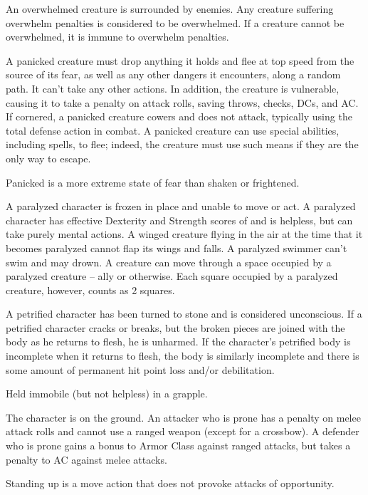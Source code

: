  An overwhelmed creature is surrounded by enemies. Any creature suffering overwhelm penalties is considered to be overwhelmed. If a creature cannot be overwhelmed, it is immune to overwhelm penalties.

 A panicked creature must drop anything it holds and flee at top speed from the source of its fear, as well as any other dangers it encounters, along a random path. It can't take any other actions. In addition, the creature is vulnerable, causing it to take a  penalty on attack rolls, saving throws, checks, DCs, and AC. If cornered, a panicked creature cowers and does not attack, typically using the total defense action in combat. A panicked creature can use special abilities, including spells, to flee; indeed, the creature must use such means if they are the only way to escape.

Panicked is a more extreme state of fear than shaken or frightened.

 A paralyzed character is frozen in place and unable to move or act. A paralyzed character has effective Dexterity and Strength scores of  and is helpless, but can take purely mental actions. A winged creature flying in the air at the time that it becomes paralyzed cannot flap its wings and falls. A paralyzed swimmer can't swim and may drown. A creature can move through a space occupied by a paralyzed creature -- ally or otherwise. Each square occupied by a paralyzed creature, however, counts as 2 squares.

 A petrified character has been turned to stone and is considered unconscious. If a petrified character cracks or breaks, but the broken pieces are joined with the body as he returns to flesh, he is unharmed. If the character's petrified body is incomplete when it returns to flesh, the body is similarly incomplete and there is some amount of permanent hit point loss and/or debilitation.

 Held immobile (but not helpless) in a grapple.

 The character is on the ground. An attacker who is prone has a  penalty on melee attack rolls and cannot use a ranged weapon (except for a crossbow). A defender who is prone gains a  bonus to Armor Class against ranged attacks, but takes a  penalty to AC against melee attacks.

Standing up is a move action that does not provoke attacks of opportunity.

